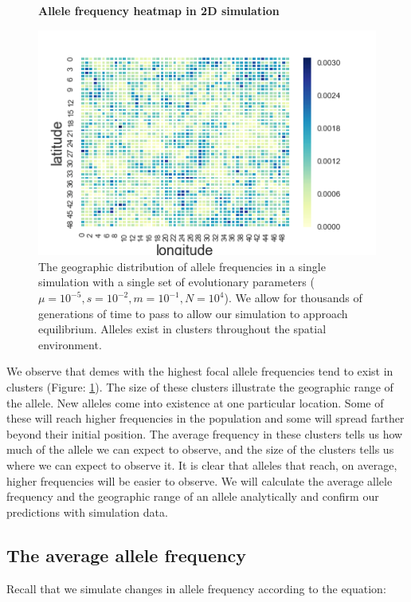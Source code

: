 \begin{figure}[H]
    \centering
    \textbf{Allele frequency heatmap in 2D simulation} \par \medskip
    \hspace*{+1.5cm}  
    \includegraphics[scale=1]{img/heatmap.png}
    \caption{The geographic distribution of allele frequencies in a single simulation with a single set of evolutionary parameters ($\mu = 10^{-5},s = 10^{-2},m=10^{-1},N=10^{4}$). We allow for thousands of generations of time to pass to allow our simulation to approach equilibrium. Alleles exist in clusters throughout the spatial environment.}
    \label{fig:geog_sim}
\end{figure}


We observe that demes with the highest focal allele frequencies tend to exist in clusters (Figure: \ref{fig:geog_sim}). The size of these clusters illustrate the geographic range of the allele. New alleles come into existence at one particular location. Some of these will reach higher frequencies in the population and some will spread farther beyond their initial position. The average frequency in these clusters tells us how much of the allele we can expect to observe, and the size of the clusters tells us where we can expect to observe it. It is clear that alleles that reach, on average, higher frequencies will be easier to observe. We will calculate the average allele frequency and the geographic range of an allele analytically and confirm our predictions with simulation data.


\subsection{The average allele frequency}
Recall that we simulate changes in allele frequency according to the equation:

